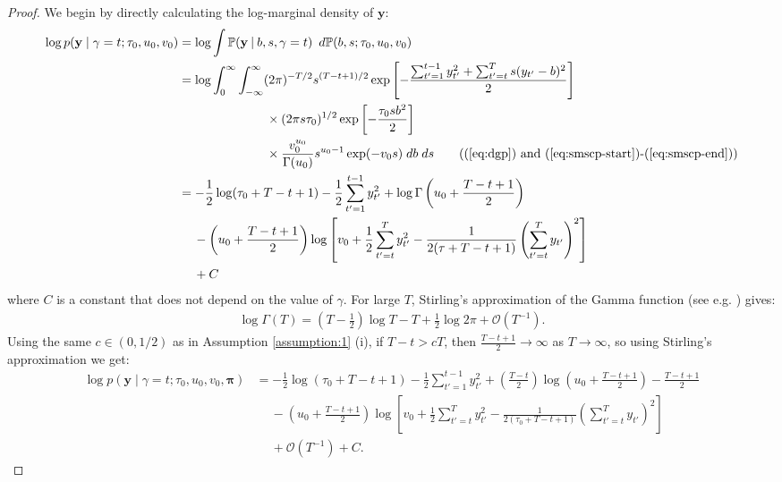 \begin{proof} 
We begin by directly calculating the log-marginal density of $\mathbf{y}$: 
\begin{align*}
    \log p(\mathbf{y} \;|\; \gamma = t; \tau_0,u_0,v_0) &= \log \int \Pr(\mathbf{y} \:|\:b,s,\gamma = t) \:\; d\Pr(b,s;\tau_0, u_0, v_0) \\
    &= \log \int_{0}^\infty\int_{-\infty}^\infty (2\pi)^{-T/2} s^{(T-t+1)/2} \exp\left[-\frac{\sum_{t'=1}^{t-1} y_{t'}^2 + \sum_{t'=t}^{T} s(y_{t'} - b)^2}{2}\right]  \\
    &\quad\quad\quad\quad\quad\quad\quad  \times (2\pi s\tau_0)^{1/2}\exp\left[-\frac{\tau_0 s b^2}{2}\right] \\
    &\quad\quad\quad\quad\quad\quad\quad  \times\frac{v_0^{u_0}}{\Gamma(u_0)}s^{u_0- 1}\exp(-v_0 s) \; db\; ds \tag{(\ref{eq:dgp}) and (\ref{eq:smscp-start})-(\ref{eq:smscp-end})} \\
    &= -\frac{1}{2}\log(\tau_0 + T - t + 1) - \frac{1}{2}\sum_{t'=1}^{t-1} y_{t'}^2 + \log \Gamma\left(u_0 + \frac{T - t +1}{2}\right) \\
    &\quad\: - \left(u_0 + \frac{T - t +1}{2}\right)\log\left[v_0 +\frac{1}{2}\sum_{t'=t}^T y_{t'}^2 - \frac{1}{2(\tau + T- t +1)}\left(\sum_{t'=t}^T y_{t'}\right)^2 \right] \\
    &\quad\: + C
\end{align*}
where $C$ is a constant that does not depend on the value of $\gamma$. For large $T$, Stirling's approximation of the Gamma function (see e.g. \citealp{abramowitz68}) gives: 
\begin{align*}
    \log \Gamma(T) = \left(T - \frac{1}{2}\right) \log T - T + \frac{1}{2} \log 2 \pi + \mathcal{O}(T^{-1}).
\end{align*}
Using the same $c \in (0,1/2)$ as in Assumption \ref{assumption:1} (i), if $T-t > cT$, then $\frac{T-t+1}{2} \to \infty$ as $T \to \infty$, so using Stirling's approximation we get:
\small
\begin{align*}
    \log p(\mathbf{y} \;|\; \gamma = t; \tau_0,u_0,v_0, \boldsymbol{\pi}) &= -\frac{1}{2}\log(\tau_0 + T - t + 1) - \frac{1}{2}\sum_{t'=1}^{t-1} y_{t'}^2  +\left(\frac{T-t}{2}\right) \log \left(u_0 + \frac{T-t+1}{2}\right) - \frac{T-t+1}{2}  \\
    &\quad\: - \left(u_0 + \frac{T - t +1}{2}\right)\log\left[v_0 +\frac{1}{2}\sum_{t'=t}^T y_{t'}^2 - \frac{1}{2(\tau_0 + T- t +1)}\left(\sum_{t'=t}^T y_{t'}\right)^2 \right] \\
    &\quad\:+ \mathcal{O}(T^{-1}) + C.
\end{align*}

\end{proof}
